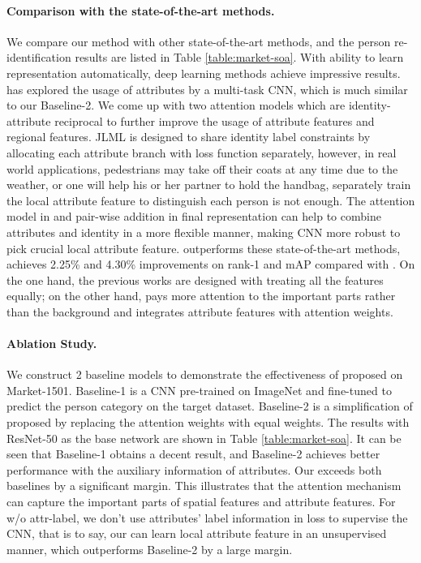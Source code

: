 \documentclass[sigconf]{acmart}
\begin{document}
\paragraph{Comparison with the state-of-the-art methods.}
We compare our method with other state-of-the-art methods, and the person re-identification results are listed in Table \ref{table:market-soa}. With ability to learn representation automatically, deep learning methods achieve impressive results. \cite{lin2017improving} has explored the usage of attributes by a multi-task CNN, which is much similar to our Baseline-2. We come up with two attention models which are identity-attribute reciprocal to further improve the usage of attribute features and
regional features. JLML \cite{ijcai2017-305} is designed to share identity label constraints by allocating each attribute branch with loss function separately, however, in real world applications, pedestrians may take off their coats at any time due to the weather, or one will help his or her partner to hold the handbag, separately train the local attribute feature to distinguish each person is not enough. The attention model in  and pair-wise addition in final representation can help to combine attributes and identity in a more flexible manner, making CNN more robust to pick crucial local attribute feature.  outperforms these state-of-the-art methods, achieves 2.25\% and 4.30\% improvements on rank-1 and mAP compared with \cite{lin2017improving}. On the one hand, the previous works are designed with treating all the features equally; on the other hand,  pays more attention to the important parts rather than the background and integrates attribute features with attention weights.

\paragraph{Ablation Study.}
We construct 2 baseline models to demonstrate the effectiveness of proposed  on Market-1501. Baseline-1 is a CNN pre-trained on ImageNet \cite{russakovsky2015imagenet} and fine-tuned to predict the person category on the target dataset. Baseline-2 is a simplification of proposed  by replacing the attention weights with equal weights. The results with ResNet-50 as the base network are shown in Table \ref{table:market-soa}. It can be seen that Baseline-1 obtains a decent result, and Baseline-2 achieves better performance with the auxiliary information of attributes. Our  exceeds both baselines by a significant margin. This illustrates that the attention mechanism can capture the important parts of spatial features and attribute features. For  w/o attr-label, we don't use attributes' label information in loss to supervise the CNN, that is to say, our  can learn local attribute feature in an unsupervised manner, which outperforms Baseline-2 by a large margin.
\end{document}
